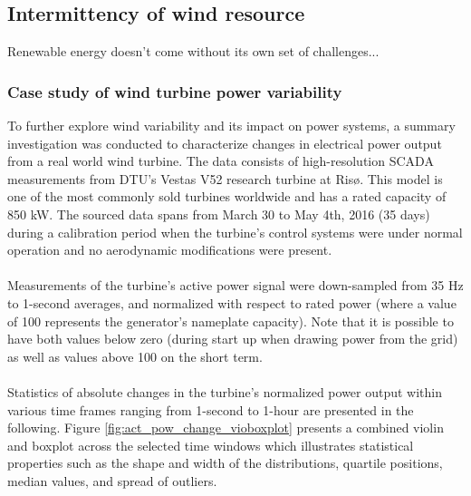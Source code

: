 \subsection{Intermittency of wind resource}
\label{sec:intro_intermittency}

Renewable energy doesn't come without its own set of challenges...




\clearpage
\subsubsection{Case study of wind turbine power  variability}
\label{sec:intro_intermittency_V52}

To further explore wind variability and its impact on power systems, a summary investigation was conducted to characterize changes in electrical power output from a real world wind turbine. The data consists of high-resolution SCADA measurements from DTU's Vestas V52 research turbine at Ris{\o}. This model is one of the most commonly sold turbines worldwide and has a rated capacity of 850 kW. The sourced data spans from March 30 to May 4th, 2016 (35 days) during a calibration period when the turbine's control systems were under normal operation and no aerodynamic modifications were present. 
\\\\
Measurements of the turbine's active power signal were down-sampled from 35 Hz to 1-second averages, and normalized with respect to rated power (where a value of 100 represents the generator's nameplate capacity). Note that it is possible to have both values below zero (during start up when drawing power from the grid) as well as values above 100 on the short term.
\\\\
Statistics of absolute changes in the turbine's normalized power output within various time frames ranging from 1-second to 1-hour are presented in the following. Figure \ref{fig:act_pow_change_vioboxplot} presents a combined violin and boxplot across the selected time windows which illustrates statistical properties such as the shape and width of the distributions, quartile positions, median values, and spread of outliers.

